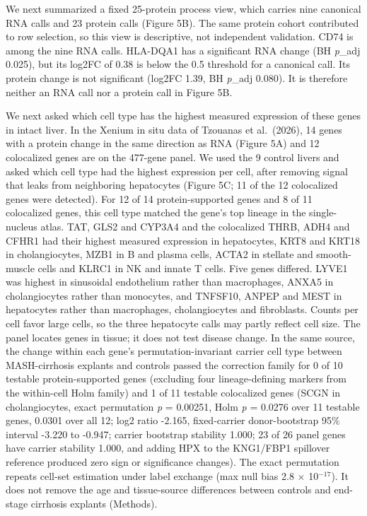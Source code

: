We next summarized a fixed 25-protein process view, which carries nine canonical
RNA calls and 23 protein calls (Figure 5B). The same protein cohort contributed
to row selection, so this view is descriptive, not independent validation. CD74
is among the nine RNA calls. HLA-DQA1 has a significant RNA change (BH
\emph{p}\_\allowbreak{}adj 0.025), but its log2FC of 0.38 is below the 0.5 threshold for a canonical
call. Its protein change is not significant (log2FC 1.39, BH \emph{p}\_\allowbreak{}adj 0.080). It
is therefore neither an RNA call nor a protein call in Figure 5B.



We next asked which cell type has the highest measured expression of these genes in intact liver. In the
Xenium in situ data of Tzouanas et al.~(2026), 14
genes with a protein change in the same direction as RNA (Figure 5A) and 12
colocalized genes are on the 477-gene panel. We used the 9 control livers and
asked which cell type had the highest expression per cell, after removing signal
that leaks from neighboring hepatocytes (Figure 5C; 11 of the 12 colocalized
genes were detected). For 12 of 14 protein-supported genes and 8 of 11
colocalized genes, this cell type matched the gene's top lineage in the
single-nucleus atlas. TAT, GLS2 and CYP3A4 and the colocalized THRB, ADH4 and
CFHR1 had their highest measured expression in hepatocytes, KRT8 and KRT18
in cholangiocytes, MZB1 in B and plasma cells, ACTA2 in stellate and
smooth-muscle cells and KLRC1 in NK and innate T cells. Five genes differed. LYVE1 was highest in sinusoidal
endothelium rather than macrophages, ANXA5 in cholangiocytes rather than
monocytes, and TNFSF10, ANPEP and MEST in hepatocytes rather than macrophages,
cholangiocytes and fibroblasts. Counts per cell favor large cells, so the three
hepatocyte calls may partly reflect cell size. The panel locates genes in
tissue; it does not test disease change. In the same source, the change within
each gene's permutation-invariant carrier cell type between MASH-cirrhosis explants and controls passed the
correction family for 0 of 10 testable protein-supported genes (excluding four lineage-defining markers from the within-cell Holm family) and 1 of 11 testable
colocalized genes (SCGN in cholangiocytes, exact permutation \emph{p} = 0.00251,
Holm \emph{p} = 0.0276 over 11 testable genes, 0.0301 over all 12; log2 ratio -2.165, fixed-carrier donor-bootstrap 95\% interval
-3.220 to -0.947; carrier bootstrap stability 1.000; 23 of 26 panel genes have carrier stability 1.000, and adding HPX to the KNG1/FBP1 spillover reference produced zero sign or significance changes). The exact permutation repeats cell-set estimation under label exchange (max null bias 2.8 $\times$ 10$^{-17}$). It does not remove the age and tissue-source differences between
controls and end-stage cirrhosis explants (Methods).

